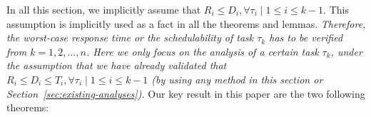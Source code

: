 



 \begin{table*}[t]
    \centering
    \renewcommand{\arraystretch}{1.7}
    \caption{Detailed procedure in Example~\ref{ex:general_framework} for deriving the upper bound of $R_3$, with $R_1-C_1=5$ and $R_2-C_2=9$.}
    \label{tab:example3-calculation}
  \end{table*}


In all this section, we implicitly assume that $R_i
\leq D_i, \forall \tau_i \mid 1 \leq i \leq k-1$.  This assumption is implicitly used as a fact in all the theorems and lemmas. \emph{Therefore, the worst-case response time or the schedulability of task $\tau_k$ has to be verified from $k=1,2,\ldots, n$. Here we only focus on the analysis of a certain task $\tau_k$, under the assumption that we have already validated that $R_i
\leq D_i \leq T_i, \forall \tau_i \mid 1 \leq i \leq k-1$ (by using any method in this section or Section~\ref{sec:existing-analyses}). } 
Our key result in
this paper are the two following theorems:

